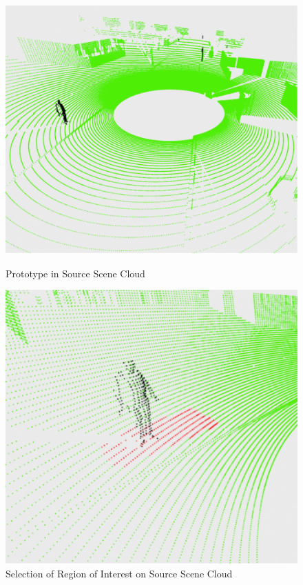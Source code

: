 \begin{figure}[htbp]
    \centering
    \begin{minipage}[b]{0.45\textwidth}
    \centering
    \includegraphics[width=1\linewidth]{97_graphics/results/prototype_on_source_scene_cloud.pdf}
    \caption{Prototype in Source Scene Cloud}
    \label{fig:result-prototype_on_source_scene}
    \end{minipage}
    \hfill
    \begin{minipage}[b]{0.45\textwidth}
    \centering
    \includegraphics[width=1\linewidth]{97_graphics/results/roi_select_source_scene_cloud.pdf}
    \caption{Selection of Region of Interest on Source Scene Cloud}
    \label{fig:result-roi_select_source_scene}
    \end{minipage}
\end{figure}


